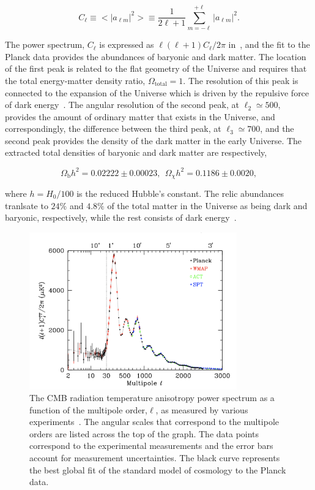 \begin{equation}
  C_{\ell} \equiv <|a_{\ell m}|^{2}> \equiv \frac{1}{2\ell+1}\sum^{+\ell}_{m=-\ell}|a_{\ell m}|^2.
\end{equation}

The power spectrum, $C_{\ell}$ is expressed as $\ell(\ell+1)C_{\ell}/2\pi$ in~, and the fit to the Planck data provides the abundances of baryonic and dark matter. The location of the first peak is related to the flat geometry of the Universe and requires that the total energy-matter density ratio, $\Omega_\mathrm{total}=1$. The resolution of this peak is connected to the expansion of the Universe which is driven by the repulsive force of dark energy~\cite{Spergel:2006hy}. The angular resolution of the second peak, at $\ell_{2}\simeq500$, provides the amount of ordinary matter that exists in the Universe, and correspondingly, the difference between the third peak, at $\ell_{3}\simeq700$, and the second peak provides the density of the dark matter in the early Universe. The extracted total densities of baryonic and dark matter are respectively,

\begin{equation}
  \Omega_{\mathrm{b}}h^2 = 0.02222 \pm 0.00023,\:\:\Omega_{\chi}h^2 = 0.1186 \pm 0.0020,
\end{equation}

where $h = H_{0}/100$ is the reduced Hubble's constant. The relic abundances tranlsate to $24\%$ and $4.8\%$ of the total matter in the Universe as being dark and baryonic, respectively, while the rest consists of dark energy~\cite{Agashe:2014kda}.

\begin{figure}
  \centering
  \includegraphics[width=0.8\textwidth]{figs/CMB_multipole}
  \caption{The CMB radiation temperature anisotropy power spectrum as a function of the multipole order,$\ell$, as measured by various experiments~\cite{Agashe:2014kda}. The angular scales that correspond to the multipole orders are listed across the top of the graph. The data points correspond to the experimental measurements and the error bars account for measurement uncertainties. The black curve represents the best global fit of the standard model of cosmology to the Planck data.}
  \label{fig:CMB}
\end{figure}

